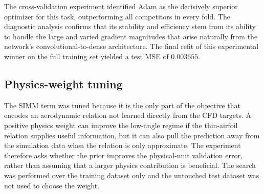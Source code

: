 The cross-validation experiment identified Adam as the decisively superior optimizer for this task, outperforming all competitors in every fold. The diagnostic analysis confirms that its stability and efficiency stem from its ability to handle the large and varied gradient magnitudes that arise naturally from the network's convolutional-to-dense architecture. The final refit of this experimental winner on the full training set yielded a test MSE of $0.003655$.

\subsection{Physics-weight tuning}
\label{sec:04_physics_weight_tuning}

The SIMM term was tuned because it is the only part of the objective that encodes an aerodynamic relation not learned directly from the CFD targets. A positive physics weight can improve the low-angle regime if the thin-airfoil relation supplies useful information, but it can also pull the prediction away from the simulation data when the relation is only approximate. The experiment therefore asks whether the prior improves the physical-unit validation error, rather than assuming that a larger physics contribution is beneficial. The search was performed over the training dataset only and the untouched test dataset was not used to choose the weight.\\

